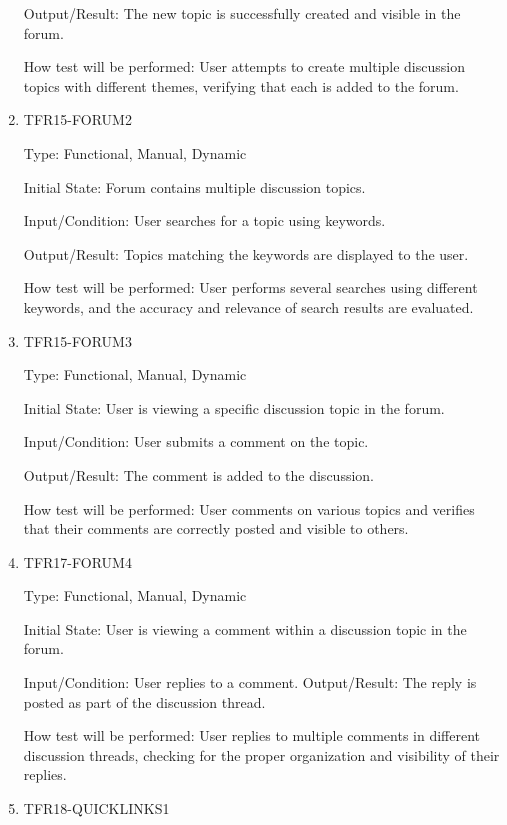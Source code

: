 \documentclass[12pt, titlepage]{article}
\begin{document}
\begin{enumerate}
Output/Result: The new topic is successfully created and visible in the forum.

How test will be performed: User attempts to create multiple discussion topics with different themes, verifying that each is added to the forum.

\item{TFR15-FORUM2\\}\label{TFR15-FORUM2}

Type: Functional, Manual, Dynamic

Initial State: Forum contains multiple discussion topics.

Input/Condition: User searches for a topic using keywords.

Output/Result: Topics matching the keywords are displayed to the user.

How test will be performed: User performs several searches using different keywords, and the accuracy and relevance of search results are evaluated.


\item{TFR15-FORUM3\\}\label{TFR16-FORUM3}

Type: Functional, Manual, Dynamic

Initial State: User is viewing a specific discussion topic in the forum.

Input/Condition: User submits a comment on the topic.

Output/Result: The comment is added to the discussion.

How test will be performed: User comments on various topics and verifies that their comments are correctly posted and visible to others.

\item{TFR17-FORUM4\\}\label{TFR17-FORUM4}

Type: Functional, Manual, Dynamic

Initial State: User is viewing a comment within a discussion topic in the forum.

Input/Condition: User replies to a comment.
Output/Result: The reply is posted as part of the discussion thread.

How test will be performed: User replies to multiple comments in different discussion threads, checking for the proper organization and visibility of their replies.

\item{TFR18-QUICKLINKS1\\}\label{TFR18-QUICKLINKS1}


\end{enumerate}
\end{document}
